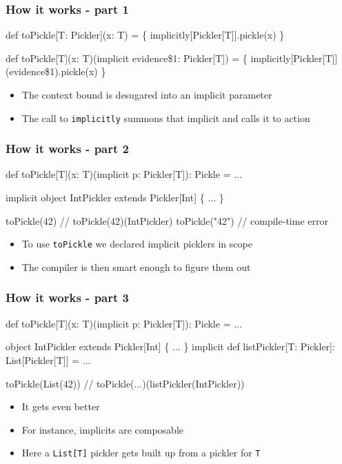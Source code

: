\documentclass[svgnames,hyperref={bookmarks=false}]{beamer}
\begin{document}
\begin{frame}[fragile]
\frametitle{How it works - part 1}

\begin{semiverbatim}
def toPickle[T: Pickler](x: T) = \{
  implicitly[Pickler[T]].pickle(x)
\}

def toPickle[T](x: T)(implicit evidence\$1: Pickler[T]) = \{
  implicitly[Pickler[T]](evidence\$1).pickle(x)
\}

\end{semiverbatim}

\begin{itemize}
\item The context bound is desugared into an implicit parameter
\item The call to \texttt{implicitly} summons that implicit and calls it to action
\end{itemize}
\end{frame}

\begin{frame}[fragile]
\frametitle{How it works - part 2}

\begin{semiverbatim}
def toPickle[T](x: T)(implicit p: Pickler[T]): Pickle = ...

implicit object IntPickler extends Pickler[Int] \{ ... \}

toPickle(42) // toPickle(42)(IntPickler)
toPickle("42") // compile-time error

\end{semiverbatim}

\begin{itemize}
\item To use \texttt{toPickle} we declared implicit picklers in scope
\item The compiler is then smart enough to figure them out
\end{itemize}
\end{frame}

\begin{frame}[fragile]
\frametitle{How it works - part 3}

\begin{semiverbatim}
def toPickle[T](x: T)(implicit p: Pickler[T]): Pickle = ...

object IntPickler extends Pickler[Int] \{ ... \}
implicit def listPickler[T: Pickler]: List[Pickler[T]] = ...

toPickle(List(42)) // toPickle(...)(listPickler(IntPickler))

\end{semiverbatim}

\begin{itemize}
\item It gets even better
\item For instance, implicits are composable
\item Here a \texttt{List[T]} pickler gets built up from a pickler for \texttt{T}
\end{itemize}
\end{frame}
\end{document}

